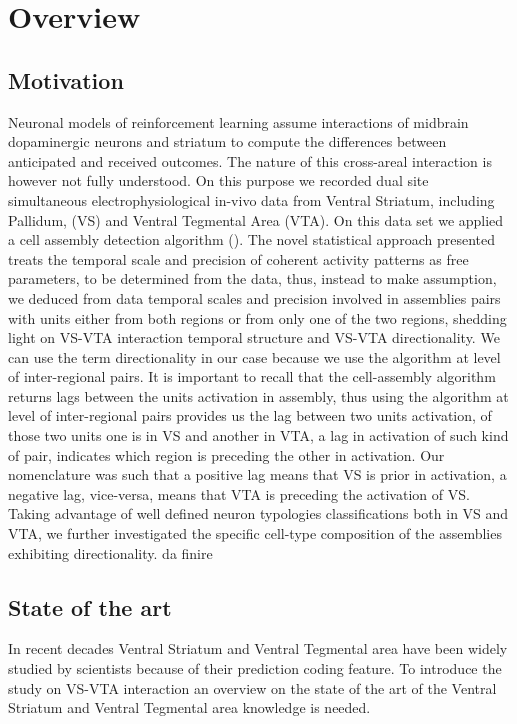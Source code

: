 \chapter{Overview}
\label{chap:Overview}
\section{Motivation}
\label{sec:Motivation}
Neuronal models of reinforcement learning assume interactions of midbrain dopaminergic neurons and striatum to compute the differences between anticipated and received outcomes. The nature of this cross-areal interaction is however not fully understood. On this purpose we recorded dual site simultaneous electrophysiological in-vivo data from Ventral Striatum, including Pallidum, (VS) and Ventral Tegmental Area (VTA). On this data set we applied a cell assembly detection algorithm (\cite{RussoDurstewitz}).
The novel statistical approach presented treats the temporal scale and precision of coherent activity patterns as free parameters, to be determined from the data, thus, instead to make assumption, we deduced from data temporal scales and precision involved in assemblies pairs with units either from both regions or from only one of the two regions, shedding light on VS-VTA interaction temporal structure and VS-VTA directionality.
We can use the term directionality in our case because we use the algorithm at level of inter-regional pairs. It is important to recall that the cell-assembly algorithm returns lags between the units activation in assembly, thus using the algorithm at level of inter-regional pairs provides us the lag between two units activation, of those two units one is in VS and another in VTA, a lag in activation of such kind of pair, indicates which region is preceding the other in activation.
Our nomenclature was such that a positive lag means that VS is prior in activation, a negative lag, vice-versa, means that VTA is preceding the activation of VS.
Taking advantage of well defined neuron typologies classifications both in VS and VTA, we further investigated the specific cell-type composition of the assemblies exhibiting directionality. 
{\color{red}da finire}
\section{State of the art}
\label{sec:StateArt}
 In recent decades Ventral Striatum and Ventral Tegmental area have been widely studied by scientists because of their prediction coding feature.
 To introduce the study on VS-VTA interaction an overview on the state of the art of the Ventral Striatum and Ventral Tegmental area knowledge is needed.
